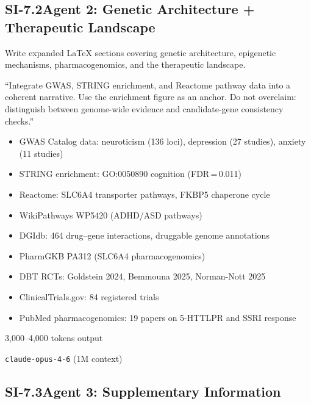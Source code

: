 \subsection*{SI-7.2\quad Agent 2: Genetic Architecture + Therapeutic Landscape}

\begin{description}[style=nextline, nosep]
  \item[Assignment]
    Write expanded \LaTeX{} sections covering genetic architecture, epigenetic
    mechanisms, pharmacogenomics, and the therapeutic landscape.
  \item[Key directive]
    ``Integrate GWAS, STRING enrichment, and Reactome pathway data into a
    coherent narrative.  Use the enrichment figure as an anchor.  Do not
    overclaim: distinguish between genome-wide evidence and candidate-gene
    consistency checks.''
  \item[Evidence provided]
    \begin{itemize}[nosep]
      \item GWAS Catalog data: neuroticism (136 loci), depression (27 studies),
            anxiety (11 studies)
      \item STRING enrichment: GO:0050890 cognition (FDR\,=\,0.011)
      \item Reactome: SLC6A4 transporter pathways, FKBP5 chaperone cycle
      \item WikiPathways WP5420 (ADHD/ASD pathways)
      \item DGIdb: 464 drug--gene interactions, druggable genome annotations
      \item PharmGKB PA312 (SLC6A4 pharmacogenomics)
      \item DBT RCTs: Goldstein 2024, Bemmouna 2025, Norman-Nott 2025
      \item ClinicalTrials.gov: 84 registered trials
      \item PubMed pharmacogenomics: 19 papers on 5-HTTLPR and SSRI response
    \end{itemize}
  \item[Approximate token budget] 3,000--4,000 tokens output
  \item[Model] \texttt{claude-opus-4-6} (1M context)
\end{description}

\subsection*{SI-7.3\quad Agent 3: Supplementary Information}

